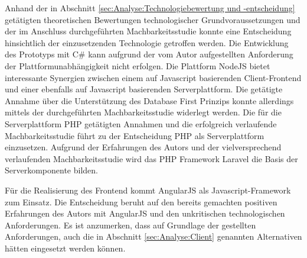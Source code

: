 Anhand der in Abschnitt \ref{sec:Analyse:Technologiebewertung und -entscheidung} getätigten theoretischen Bewertungen technologischer Grundvoraussetzungen und der im Anschluss durchgeführten Machbarkeitsstudie konnte eine Entscheidung hinsichtlich der einzusetzenden Technologie getroffen werden. Die Entwicklung des Prototyps mit C\# kann aufgrund der vom Autor aufgestellten Anforderung der Plattformunabhängigkeit nicht erfolgen. Die Plattform NodeJS bietet interessante Synergien zwischen einem auf Javascript basierenden Client-Frontend und einer ebenfalls auf Javascript basierenden Serverplattform. Die getätigte Annahme über die Unterstützung des Database First Prinzips konnte allerdings mittels der durchgeführten Machbarkeitsstudie widerlegt werden. Die für die Serverplattform PHP getätigten Annahmen und die erfolgreich verlaufende Machbarkeitsstudie führt zu der Entscheidung PHP als Serverplattform einzusetzen. Aufgrund der Erfahrungen des Autors und der vielversprechend verlaufenden Machbarkeitsstudie wird das PHP Framework Laravel die Basis der Serverkomponente bilden.

Für die Realisierung des Frontend kommt AngularJS als Javascript-Framework zum Einsatz. Die Entscheidung beruht auf den bereits gemachten positiven Erfahrungen des Autors mit AngularJS und den unkritischen technologischen Anforderungen. Es ist anzumerken, dass auf Grundlage der gestellten Anforderungen, auch die in Abschnitt \ref{sec:Analyse:Client} genannten Alternativen hätten eingesetzt werden können.